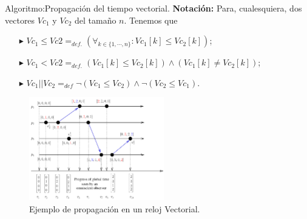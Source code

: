 \begin{frame}{Algoritmo:}{Propagación del tiempo vectorial.}
  \justifying
  \textbf{Notación:} Para, cualesquiera, dos vectores $Vc_1$
  y $Vc_2$ del tamaño $n$. Tenemos que
  \begin{itemize}
  \item[$\blacktriangleright$] $Vc_1 \leq Vc2 =_{def.}
    \left(\forall_{k \in \{1, \dotsm, n\}} : Vc_1[k] \leq Vc_2[k]\right)$;
  \item[$\blacktriangleright$] $Vc_1 < Vc2 =_{def.}
    \left(Vc_1[k] \leq Vc_2[k]\right) \land  \left(Vc_1[k] \not= Vc_2[k]\right)$;
  \item[$\blacktriangleright$] $Vc_1 || Vc_2 =_{def} \neg (Vc_1 \leq Vc_2) \land
    \neg (Vc_2 \leq Vc_1)$.
  \end{itemize}
  \begin{figure}
    \includegraphics[height = 4.5cm]{./Imagenes/RelojVectorialCompuesto.png}
    \caption{Ejemplo de propagación en un reloj Vectorial.}
  \end{figure}
\end{frame}
